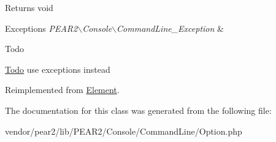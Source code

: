 \begin{DoxyReturn}{\-Returns}
void 
\end{DoxyReturn}

\begin{DoxyExceptions}{\-Exceptions}
{\em \-P\-E\-A\-R2$\backslash$\-Console$\backslash$\-Command\-Line\-\_\-\-Exception} & \\
\hline
\end{DoxyExceptions}
\begin{DoxyRefDesc}{\-Todo}
\item[\hyperlink{todo__todo000006}{\-Todo}]use exceptions instead \end{DoxyRefDesc}


\-Reimplemented from \hyperlink{class_p_e_a_r2_1_1_console_1_1_command_line_1_1_element_a184909dab34698899937d810a9f5d393}{\-Element}.



\-The documentation for this class was generated from the following file\-:\begin{DoxyCompactItemize}
\item 
vendor/pear2/lib/\-P\-E\-A\-R2/\-Console/\-Command\-Line/\-Option.\-php\end{DoxyCompactItemize}
